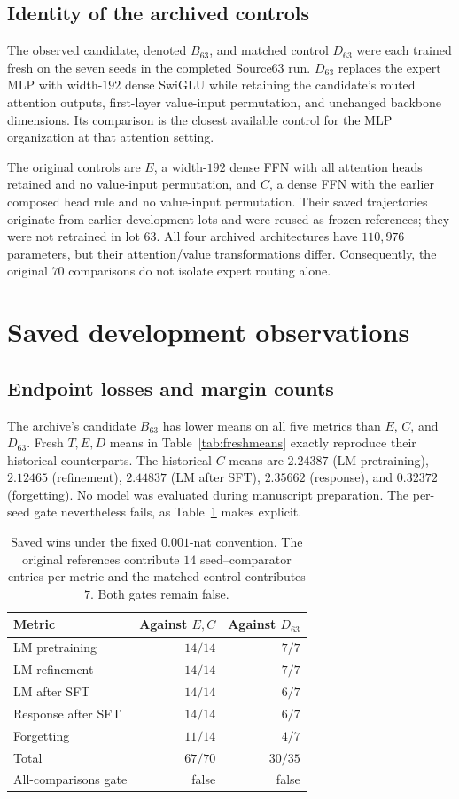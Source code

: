 \documentclass{article}
\begin{document}
\subsection{Identity of the archived controls}
The observed candidate, denoted $B_{63}$, and matched control $D_{63}$ were each trained fresh on the seven seeds in the completed Source63 run. $D_{63}$ replaces the expert MLP with width-$192$ dense SwiGLU while retaining the candidate's routed attention outputs, first-layer value-input permutation, and unchanged backbone dimensions. Its comparison is the closest available control for the MLP organization at that attention setting.

The original controls are $E$, a width-$192$ dense FFN with all attention heads retained and no value-input permutation, and $C$, a dense FFN with the earlier composed head rule and no value-input permutation. Their saved trajectories originate from earlier development lots and were reused as frozen references; they were not retrained in lot $63$. All four archived architectures have $110{,}976$ parameters, but their attention/value transformations differ. Consequently, the original $70$ comparisons do not isolate expert routing alone.

\section{Saved development observations}
\label{sec:observations}
\subsection{Endpoint losses and margin counts}
The archive's candidate $B_{63}$ has lower means on all five metrics than $E$, $C$, and $D_{63}$. Fresh $T,E,D$ means in Table~\ref{tab:freshmeans} exactly reproduce their historical counterparts. The historical $C$ means are $2.24387$ (LM pretraining), $2.12465$ (refinement), $2.44837$ (LM after SFT), $2.35662$ (response), and $0.32372$ (forgetting). No model was evaluated during manuscript preparation. The per-seed gate nevertheless fails, as Table~\ref{tab:wins} makes explicit.

\begin{table}[t]
\centering
\caption{Saved wins under the fixed $0.001$-nat convention. The original references contribute $14$ seed--comparator entries per metric and the matched control contributes $7$. Both gates remain false.}
\label{tab:wins}
\begin{tabular}{lrr}
\toprule
Metric & Against $E,C$ & Against $D_{63}$\\
\midrule
LM pretraining & $14/14$ & $7/7$\\
LM refinement & $14/14$ & $7/7$\\
LM after SFT & $14/14$ & $6/7$\\
Response after SFT & $14/14$ & $6/7$\\
Forgetting & $11/14$ & $4/7$\\
\midrule
Total & $67/70$ & $30/35$\\
All-comparisons gate & false & false\\
\bottomrule
\end{tabular}
\end{table}
\end{document}

